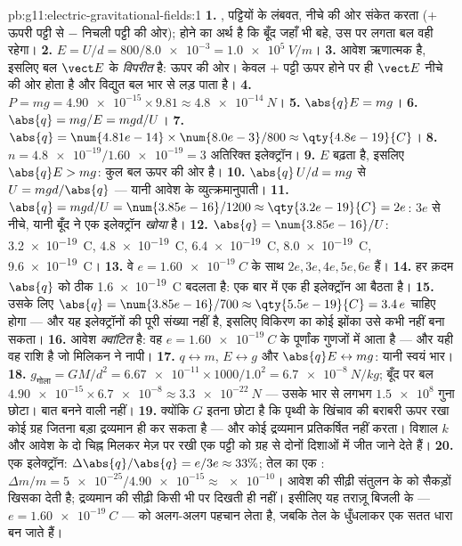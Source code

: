 \begin{solution}{pb:g11:electric-gravitational-fields:1}
\textbf{1.} , पट्टियों के लंबवत, नीचे की ओर संकेत करता ($+$
ऊपरी पट्टी से $-$ निचली पट्टी की ओर);  होने का अर्थ है कि बूँद
जहाँ भी बहे, उस पर लगता बल वही रहेगा।
\textbf{2.} $E = U/d = 800 / \num{8.0e-3} = \qty{1.0e5}{V/m}$।
\textbf{3.} आवेश ऋणात्मक है, इसलिए बल $\vect E$ के \emph{विपरीत} है:
ऊपर की ओर। केवल $+$ पट्टी ऊपर होने पर ही $\vect E$ नीचे की ओर होता है और
विद्युत बल भार से लड़ पाता है।
\textbf{4.} $P = mg = \num{4.90e-15} \times 9.81 \approx
\qty{4.8e-14}{N}$।
\textbf{5.} $\abs{q}E = mg$।
\textbf{6.} $\abs{q} = mg/E = mgd/U$।
\textbf{7.} $\abs{q} = \num{4.81e-14} \times \num{8.0e-3} / 800
\approx \qty{4.8e-19}{C}$।
\textbf{8.} $n = \num{4.8e-19} / \num{1.60e-19} = 3$ अतिरिक्त इलेक्ट्रॉन।
\textbf{9.} $E$ बढ़ता है, इसलिए $\abs{q}E > mg$: कुल बल ऊपर की ओर है।
\textbf{10.} $\abs{q}\,U/d = mg$ से $U = mgd/\abs{q}$ --- यानी आवेश के व्युत्क्रमानुपाती।
\textbf{11.} $\abs{q} = mgd/U = \num{3.85e-16}/1200 \approx
\qty{3.2e-19}{C} = 2e$: $3e$ से नीचे, यानी बूँद ने एक इलेक्ट्रॉन \emph{खोया}
है।
\textbf{12.} $\abs{q} = \num{3.85e-16}/U$: \qty{3.2e-19}{C}, \qty{4.8e-19}{C}, \qty{6.4e-19}{C}, \qty{8.0e-19}{C}, \qty{9.6e-19}{C}।
\textbf{13.} वे $e = \qty{1.60e-19}{C}$ के साथ $2e, 3e, 4e, 5e, 6e$ हैं।
\textbf{14.} हर क़दम $\abs{q}$ को ठीक \qty{1.6e-19}{C} बदलता है: एक बार में एक ही
इलेक्ट्रॉन आ बैठता है।
\textbf{15.} उसके लिए $\abs{q} = \num{3.85e-16}/700 \approx
\qty{5.5e-19}{C} = 3.4\,e$ चाहिए होगा --- और यह इलेक्ट्रॉनों की पूरी
संख्या नहीं है, इसलिए विकिरण का कोई झोंका उसे कभी नहीं बना सकता।
\textbf{16.} आवेश \emph{क्वांटित} है: वह  $e = \qty{1.60e-19}{C}$ के
पूर्णांक गुणजों में आता है --- और यही वह राशि है जो मिलिकन ने नापी।
\textbf{17.} $q \leftrightarrow m$, $E \leftrightarrow g$ और $\abs{q}E \leftrightarrow mg$: यानी स्वयं भार।
\textbf{18.} $g_{\text{गोला}} = GM/d^2 = \num{6.67e-11} \times 1000 /
1.0^2 = \qty{6.7e-8}{N/kg}$; बूँद पर बल $\num{4.90e-15} \times \num{6.7e-8} \approx \qty{3.3e-22}{N}$ --- उसके भार से
लगभग $\num{1.5e8}$ गुना छोटा। बात बनने वाली नहीं।
\textbf{19.} क्योंकि $G$ इतना छोटा है कि पृथ्वी के खिंचाव की बराबरी ऊपर
रखा कोई ग्रह जितना बड़ा द्रव्यमान ही कर सकता है --- और कोई द्रव्यमान
प्रतिकर्षित नहीं करता। विशाल $k$ और आवेश के दो चिह्न मिलकर मेज़ पर रखी
एक पट्टी को ग्रह से दोनों दिशाओं में जीत जाने देते हैं।
\textbf{20.} एक इलेक्ट्रॉन: $\Delta\abs{q}/\abs{q} = e/3e \approx 33\%$; तेल का एक : $\Delta m/m = \num{5e-25} / \num{4.90e-15}
\approx \num{e-10}$। आवेश
की सीढ़ी संतुलन के  को सैकड़ों  खिसका देती है;
द्रव्यमान की सीढ़ी किसी भी  पर दिखती ही नहीं। इसीलिए यह
तराज़ू बिजली के  --- $e = \qty{1.60e-19}{C}$ --- को अलग-अलग पहचान लेता है,
जबकि तेल के  धुँधलाकर एक सतत धारा बन जाते हैं।
\end{solution}
